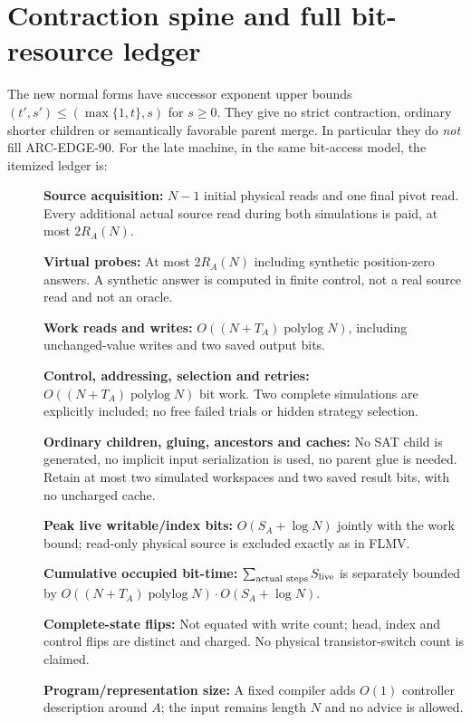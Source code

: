 \documentclass[11pt]{article}
\begin{document}
\section{Contraction spine and full bit-resource ledger}
The new normal forms have successor exponent upper
bounds $(t',s')\le(\max\{1,t\},s)$ for $s\ge0$.
They give no strict contraction, ordinary shorter
children or semantically favorable parent merge.
In particular they do \emph{not} fill ARC-EDGE-90.
For the late machine, in the same bit-access model,
the itemized ledger is:
\begin{description}
\item[] \textbf{Source acquisition:}
$N-1$ initial physical reads and one final pivot read.
Every additional actual source read during both
simulations is paid, at most $2R_A(N)$.
\item[] \textbf{Virtual probes:}
At most $2R_A(N)$ including synthetic position-zero
answers. A synthetic answer is computed in finite
control, not a real source read and not an oracle.
\item[] \textbf{Work reads and writes:}
$O((N+T_A)\operatorname{polylog}N)$, including
unchanged-value writes and two saved output bits.
\item[] \textbf{Control, addressing, selection and retries:}
$O((N+T_A)\operatorname{polylog}N)$ bit work.
Two complete simulations are explicitly included;
no free failed trials or hidden strategy selection.
\item[] \textbf{Ordinary children, gluing, ancestors and caches:}
No SAT child is generated, no implicit input
serialization is used, no parent glue is needed.
Retain at most two simulated workspaces and two
saved result bits, with no uncharged cache.
\item[] \textbf{Peak live writable/index bits:}
$O(S_A+\log N)$ jointly with the work bound;
read-only physical source is excluded exactly as in FLMV.
\item[] \textbf{Cumulative occupied bit-time:}
$\sum_{\text{actual steps}}S_{\rm live}$
is separately bounded by
$O((N+T_A)\operatorname{polylog}N)\cdot O(S_A+\log N)$.
\item[] \textbf{Complete-state flips:}
Not equated with write count; head, index and
control flips are distinct and charged.
No physical transistor-switch count is claimed.
\item[] \textbf{Program/representation size:}
A fixed compiler adds $O(1)$ controller description
around $A$; the input remains length $N$ and
no advice is allowed.
\end{description}
\end{document}
